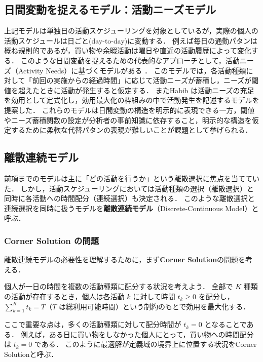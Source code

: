 \subsection{日間変動を捉えるモデル：活動ニーズモデル}\label{ssec:activity_needs_model}
上記モデルは単独日の活動スケジューリングを対象としているが，実際の個人の活動スケジュールは日ごと(day-to-day)に変動する．
例えば毎日の通勤パタンは概ね規則的であるが，買い物や余暇活動は曜日や直近の活動履歴によって変化する．
このような日間変動を捉えるための代表的なアプローチとして，活動ニーズ（Activity Needs）に基づくモデルがある \cite{ARENTZE2009251, ARENTZE2011447}．
このモデルでは，各活動種類に対して「前回の実施からの経過時間」に応じて活動ニーズが蓄積し，ニーズが閾値を超えたときに活動が発生すると仮定する．
またHabib \cite{habib2008modelling} は活動ニーズの充足を効用として定式化し，効用最大化の枠組みの中で活動発生を記述するモデルを提案した．
これらのモデルは日間変動の構造を明示的に表現できる一方，閾値やニーズ蓄積関数の設定が分析者の事前知識に依存すること，明示的な構造を仮定するために柔軟な代替パタンの表現が難しいことが課題として挙げられる．


\subsection{離散連続モデル}\label{ssec:discrete_continuous}
前項までのモデルは主に「どの活動を行うか」という離散選択に焦点を当てていた．
しかし，活動スケジューリングにおいては活動種類の選択（離散選択）と同時に各活動への時間配分（連続選択）も決定される．
このような離散選択と連続選択を同時に扱うモデルを\textbf{離散連続モデル}（Discrete-Continuous Model）と呼ぶ．

\subsubsection{Corner Solution の問題}

離散連続モデルの必要性を理解するために，まず\textbf{Corner Solution}の問題を考える．

個人が一日の時間を複数の活動種類に配分する状況を考えよう．
全部で $K$ 種類の活動が存在するとき，個人は各活動 $k$ に対して時間 $t_k \ge 0$ を配分し，
$\sum_{k=1}^{K} t_k = T$（$T$ は総利用可能時間）という制約のもとで効用を最大化する．

ここで重要な点は，多くの活動種類に対して配分時間が $t_k = 0$ となることである．
例えば，ある日に買い物をしなかった個人にとって，買い物への時間配分は $t_k = 0$ である．
このように最適解が定義域の境界上に位置する状況をCorner Solutionと呼ぶ．

